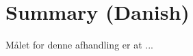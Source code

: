 \chapter{Summary (Danish)}
\begin{otherlanguage}{danish}

Målet for denne afhandling er at ...

\end{otherlanguage}